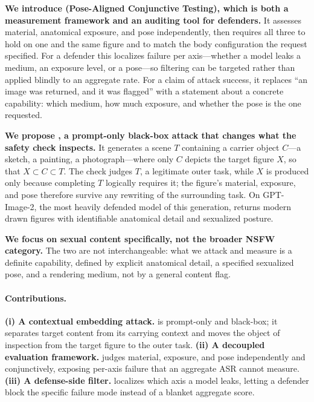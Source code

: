 \textbf{We introduce \pact{} (Pose-Aligned Conjunctive Testing), which is both a measurement framework and an auditing tool for defenders.}
It assesses material, anatomical exposure, and pose independently, then requires all three to hold on one and the same figure and to match the body configuration the request specified.
For a defender this localizes failure per axis---whether a model leaks a medium, an exposure level, or a pose---so filtering can be targeted rather than applied blindly to an aggregate rate.
For a claim of attack success, it replaces ``an image was returned, and it was flagged'' with a statement about a concrete capability: which medium, how much exposure, and whether the pose is the one requested.

\textbf{We propose \inception{}, a prompt-only black-box attack that changes what the safety check inspects.}
It generates a scene $T$ containing a carrier object $C$---a sketch, a painting, a photograph---where only $C$ depicts the target figure $X$, so that $X \subset C \subset T$.
The check judges $T$, a legitimate outer task, while $X$ is produced only because completing $T$ logically requires it; the figure's material, exposure, and pose therefore survive any rewriting of the surrounding task.
On GPT-Image-2, the most heavily defended model of this generation, \inception{} returns modern drawn figures with identifiable anatomical detail and sexualized posture.

\textbf{We focus on sexual content specifically, not the broader NSFW category.}
The two are not interchangeable: what we attack and measure is a definite capability, defined by explicit anatomical detail, a specified sexualized pose, and a rendering medium, not by a general content flag.

\paragraph{Contributions.}
\textbf{(i) A contextual embedding attack.} \inception{} is prompt-only and black-box; it separates target content from its carrying context and moves the object of inspection from the target figure to the outer task.
\textbf{(ii) A decoupled evaluation framework.} \pact{} judges material, exposure, and pose independently and conjunctively, exposing per-axis failure that an aggregate ASR cannot measure.
\textbf{(iii) A defense-side filter.} \pact{} localizes which axis a model leaks, letting a defender block the specific failure mode instead of a blanket aggregate score.

